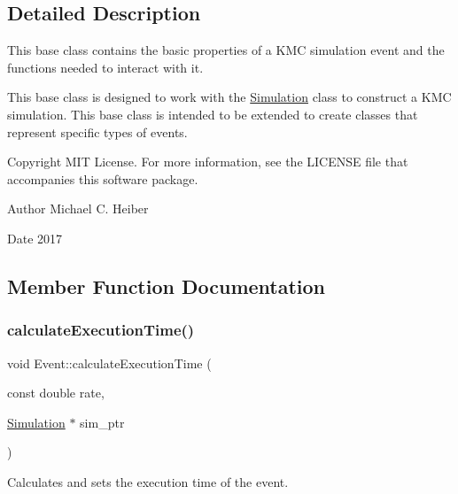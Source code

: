 \subsection{Detailed Description}
This base class contains the basic properties of a K\+MC simulation event and the functions needed to interact with it. 

This base class is designed to work with the \hyperlink{class_simulation}{Simulation} class to construct a K\+MC simulation. This base class is intended to be extended to create classes that represent specific types of events. \begin{DoxyCopyright}{Copyright}
M\+IT License. For more information, see the L\+I\+C\+E\+N\+SE file that accompanies this software package. 
\end{DoxyCopyright}
\begin{DoxyAuthor}{Author}
Michael C. Heiber 
\end{DoxyAuthor}
\begin{DoxyDate}{Date}
2017 
\end{DoxyDate}


\subsection{Member Function Documentation}
\mbox{\label{class_event_a14b3f90f4b4d72ab1d0bf70f9b4cc907}} 
\subsubsection{\texorpdfstring{calculate\+Execution\+Time()}{calculateExecutionTime()}}
{\footnotesize\ttfamily void Event\+::calculate\+Execution\+Time (\begin{DoxyParamCaption}\item[{const double}]{rate,  }\item[{\hyperlink{class_simulation}{Simulation} $\ast$}]{sim\+\_\+ptr }\end{DoxyParamCaption})}



Calculates and sets the execution time of the event. 

